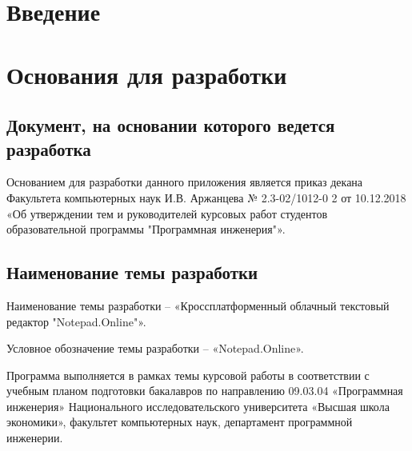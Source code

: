 \section{Введение}

\section{Основания для разработки}

\subsection{Документ, на основании которого ведется разработка}
Основанием для разработки данного приложения является приказ декана Факультета компьютерных наук И.В. Аржанцева № 2.3-02/1012-0 2 от 10.12.2018 «Об утверждении тем и руководителей курсовых работ студентов образовательной программы "Программная инженерия"».

\subsection{Наименование темы разработки}
Наименование темы разработки – «Кроссплатформенный облачный текстовый редактор "Notepad.Online"».

Условное обозначение темы разработки – «Notepad.Online».

Программа выполняется в рамках темы курсовой работы в соответствии с учебным планом подготовки бакалавров по направлению 09.03.04 «Программная инженерия» Национального исследовательского университета «Высшая школа экономики», факультет компьютерных наук, департамент программной инженерии.


